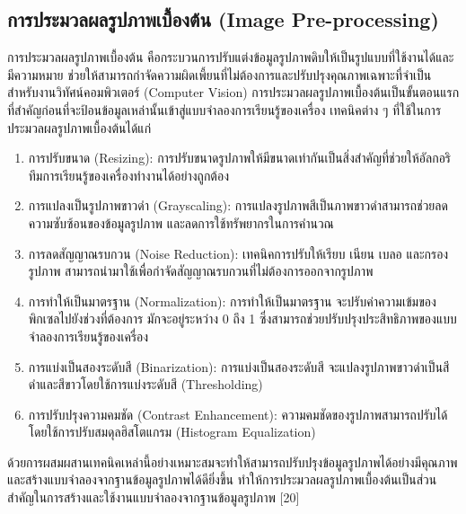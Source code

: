 \documentclass[12pt,oneside,openright,a4paper]{cpe-thai-project}
\begin{document}
\subsection{การประมวลผลรูปภาพเบื้องต้น (Image Pre-processing)}

\hspace{2em}การประมวลผลรูปภาพเบื้องต้น คือกระบวนการปรับแต่งข้อมูลรูปภาพดิบให้เป็นรูปแบบที่ใช้งานได้และมีความหมาย ช่วยให้สามารถกำจัดความผิดเพี้ยนที่ไม่ต้องการและปรับปรุงคุณภาพเฉพาะที่จำเป็นสำหรับงานวิทัศน์คอมพิวเตอร์ (Computer Vision) การประมวลผลรูปภาพเบื้องต้นเป็นขั้นตอนแรกที่สำคัญก่อนที่จะป้อนข้อมูลเหล่านั้นเข้าสู่แบบจำลองการเรียนรู้ของเครื่อง
เทคนิคต่าง ๆ ที่ใช้ในการประมวลผลรูปภาพเบื้องต้นได้แก่
\begin{enumerate}
\item การปรับขนาด (Resizing): การปรับขนาดรูปภาพให้มีขนาดเท่ากันเป็นสิ่งสำคัญที่ช่วยให้อัลกอริทึมการเรียนรู้ของเครื่องทำงานได้อย่างถูกต้อง
\item การแปลงเป็นรูปภาพขาวดำ (Grayscaling): การแปลงรูปภาพสีเป็นภาพขาวดำสามารถช่วยลดความซับซ้อนของข้อมูลรูปภาพ และลดการใช้ทรัพยากรในการคำนวณ
\item การลดสัญญาณรบกวน (Noise Reduction): เทคนิคการปรับให้เรียบ เนียน เบลอ และกรองรูปภาพ สามารถนำมาใช้เพื่อกำจัดสัญญาณรบกวนที่ไม่ต้องการออกจากรูปภาพ
\item การทำให้เป็นมาตรฐาน (Normalization): การทำให้เป็นมาตรฐาน จะปรับค่าความเข้มของพิกเซลไปยังช่วงที่ต้องการ มักจะอยู่ระหว่าง 0 ถึง 1 ซึ่งสามารถช่วยปรับปรุงประสิทธิภาพของแบบจำลองการเรียนรู้ของเครื่อง
\item การแบ่งเป็นสองระดับสี (Binarization): การแบ่งเป็นสองระดับสี จะแปลงรูปภาพขาวดำเป็นสีดำและสีขาวโดยใช้การแบ่งระดับสี (Thresholding)
\item การปรับปรุงความคมชัด (Contrast Enhancement): ความคมชัดของรูปภาพสามารถปรับได้โดยใช้การปรับสมดุลฮิสโตแกรม (Histogram Equalization)
\end{enumerate}
\hspace{2em}ด้วยการผสมผสานเทคนิคเหล่านี้อย่างเหมาะสมจะทำให้สามารถปรับปรุงข้อมูลรูปภาพได้อย่างมีคุณภาพ และสร้างแบบจำลองจากฐานข้อมูลรูปภาพได้ดียิ่งขึ้น ทำให้การประมวลผลรูปภาพเบื้องต้นเป็นส่วนสำคัญในการสร้างและใช้งานแบบจำลองจากฐานข้อมูลรูปภาพ [20]
\end{document}
